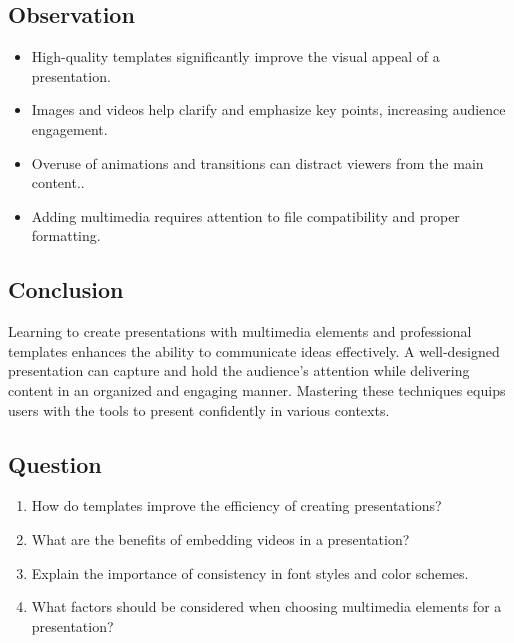\documentclass[a4paper,9pt]{article}
\begin{document}
\subsection{Observation}
\begin{itemize}
	\item High-quality templates significantly improve the visual appeal of a presentation.
	
	
	\item Images and videos help clarify and emphasize key points, increasing audience engagement.
	\item Overuse of animations and transitions can distract viewers from the main content..
	\item Adding multimedia requires attention to file compatibility and proper formatting.
\end{itemize}
\subsection{Conclusion}
Learning to create presentations with multimedia elements and professional templates enhances the ability to communicate ideas effectively. A well-designed presentation can capture and hold the audience's attention while delivering content in an organized and engaging manner. Mastering these techniques equips users with the tools to present confidently in various contexts.

\subsection{Question}

\begin{enumerate}
	\item How do templates improve the efficiency of creating presentations?
	
	\item What are the benefits of embedding videos in a presentation? 
	\item Explain the importance of consistency in font styles and color schemes.
	\item What factors should be considered when choosing multimedia elements for a presentation?
	
\end{enumerate}

\newpage

\end{document}

